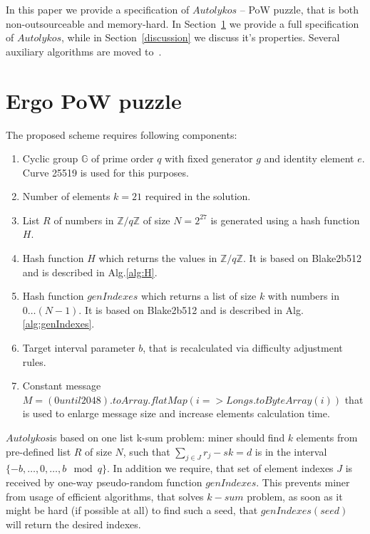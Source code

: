 \documentclass[]{article}
\newcommand{\Name}{$Autolykos$}
\begin{document}
    In this paper we provide a specification of \Name{} -- PoW puzzle, that is both
    non-outsourceable and memory-hard. In Section~\ref{puzzle} we provide a full
    specification of \Name, while in Section~\ref{discussion} we discuss it's
    properties. Several auxiliary algorithms are moved to~.

    \section{Ergo PoW puzzle}
    \label{puzzle}

    The proposed scheme requires following components:
    \begin{enumerate}
        \item Cyclic group $\mathbb{G}$ of prime order $q$ with fixed generator $g$
        and identity element $e$.
        Curve 25519 is used for this purposes.
        \item Number of elements $k=21$ required in the solution.
        \item List $R$ of numbers in $\mathbb{Z}/q\mathbb{Z}$ of size $N=2^{27}$ is generated
        using a hash function $H$.
        \item Hash function $H$ which returns the values in $\mathbb{Z}/q\mathbb{Z}$.
        It is based on Blake2b512 and is described in Alg.\ref{alg:H}.
        \item Hash function $genIndexes$ which returns a list of size $k$ with numbers in $0\dots (N-1)$.
        It is based on Blake2b512 and is described in Alg.\ref{alg:genIndexes}.
        \item Target interval parameter $b$, that is recalculated via difficulty adjustment rules.
        \item Constant message $M=(0 until 2048).toArray.flatMap(i => Longs.toByteArray(i))$ that is used to enlarge message size and increase elements calculation time.
    \end{enumerate}

    \Name is based on one list k-sum problem: miner should find
    $k$ elements from pre-defined list $R$ of size $N$, such that
    $\sum_{j \in J} r_{j} - sk = d$ is in the interval $\{-b,\dots,0,\dots,b\mod q\}$.
    In addition we require, that set of element indexes $J$ is received
    by one-way pseudo-random function $genIndexes$. This prevents miner
    from usage of efficient algorithms, that solves $k-sum$ problem, as
    soon as it might be hard (if possible at all) to find such a seed,
    that $genIndexes(seed)$ will return the desired indexes.
\end{document}
